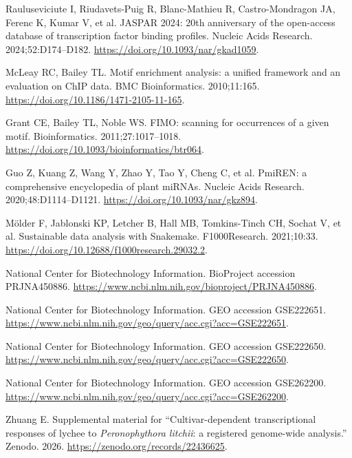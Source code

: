\documentclass[referee,pdflatex,sn-basic,Numbered]{sn-jnl}
\begin{document}
\begin{enumerate}[label={[\arabic*]},itemsep=2pt,leftmargin=2.6em]
\item Rauluseviciute I, Riudavets-Puig R, Blanc-Mathieu R, Castro-Mondragon JA, Ferenc K, Kumar V, et al. JASPAR 2024: 20th anniversary of the open-access database of transcription factor binding profiles. Nucleic Acids Research. 2024;52:D174--D182. \url{https://doi.org/10.1093/nar/gkad1059}.

\item McLeay RC, Bailey TL. Motif enrichment analysis: a unified framework and an evaluation on ChIP data. BMC Bioinformatics. 2010;11:165. \url{https://doi.org/10.1186/1471-2105-11-165}.

\item Grant CE, Bailey TL, Noble WS. FIMO: scanning for occurrences of a given motif. Bioinformatics. 2011;27:1017--1018. \url{https://doi.org/10.1093/bioinformatics/btr064}.

\item Guo Z, Kuang Z, Wang Y, Zhao Y, Tao Y, Cheng C, et al. PmiREN: a comprehensive encyclopedia of plant miRNAs. Nucleic Acids Research. 2020;48:D1114--D1121. \url{https://doi.org/10.1093/nar/gkz894}.

\item M\"older F, Jablonski KP, Letcher B, Hall MB, Tomkins-Tinch CH, Sochat V, et al. Sustainable data analysis with Snakemake. F1000Research. 2021;10:33. \url{https://doi.org/10.12688/f1000research.29032.2}.

\item National Center for Biotechnology Information. BioProject accession PRJNA450886. \url{https://www.ncbi.nlm.nih.gov/bioproject/PRJNA450886}.

\item National Center for Biotechnology Information. GEO accession GSE222651. \url{https://www.ncbi.nlm.nih.gov/geo/query/acc.cgi?acc=GSE222651}.

\item National Center for Biotechnology Information. GEO accession GSE222650. \url{https://www.ncbi.nlm.nih.gov/geo/query/acc.cgi?acc=GSE222650}.

\item National Center for Biotechnology Information. GEO accession GSE262200. \url{https://www.ncbi.nlm.nih.gov/geo/query/acc.cgi?acc=GSE262200}.

\item Zhuang E. Supplemental material for ``Cultivar-dependent transcriptional responses of lychee to \textit{Peronophythora litchii}: a registered genome-wide analysis.'' Zenodo. 2026. \url{https://zenodo.org/records/22436625}.
\end{enumerate}
\end{document}
